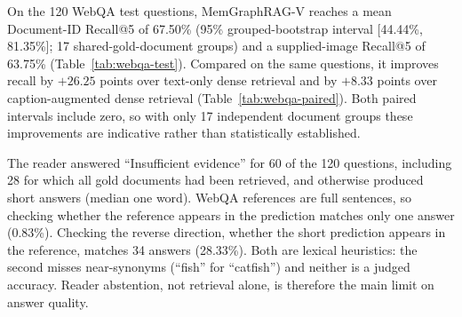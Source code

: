 On the 120 WebQA test questions, MemGraphRAG-V reaches a mean Document-ID Recall@5 of 67.50\%
(95\% grouped-bootstrap interval [44.44\%, 81.35\%]; 17 shared-gold-document groups) and a
supplied-image Recall@5 of 63.75\% (Table~\ref{tab:webqa-test}). Compared on the same questions,
it improves recall by $+26.25$ points over text-only dense retrieval and by
$+8.33$ points over caption-augmented dense retrieval (Table~\ref{tab:webqa-paired}). Both paired
intervals include zero, so with only 17 independent document groups these improvements are
indicative rather than statistically established.

The reader answered ``Insufficient evidence'' for 60 of the 120 questions, including 28 for which
all gold documents had been retrieved, and otherwise produced short answers (median one word).
WebQA references are full sentences, so checking whether the reference appears in the prediction
matches only one answer (0.83\%). Checking the reverse direction, whether the short prediction
appears in the reference, matches 34 answers (28.33\%). Both are lexical heuristics: the second
misses near-synonyms (``fish'' for ``catfish'') and neither is a judged accuracy. Reader
abstention, not retrieval alone, is therefore the main limit on answer quality.
